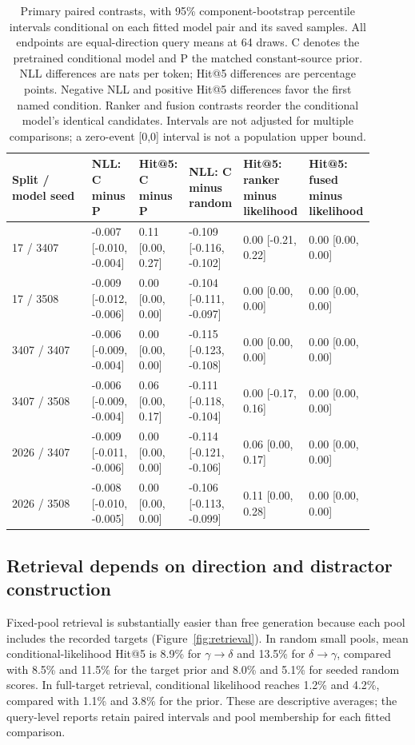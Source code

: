 \documentclass[10pt]{article}
\newcommand{\gtd}{\ensuremath{\gamma\!\rightarrow\!\delta}}
\newcommand{\dtg}{\ensuremath{\delta\!\rightarrow\!\gamma}}
\begin{document}
\begin{table}[ht]
\centering
\caption{Primary paired contrasts, with 95\% component-bootstrap percentile intervals conditional on each fitted model pair and its saved samples. All endpoints are equal-direction query means at 64 draws. C denotes the pretrained conditional model and P the matched constant-source prior. NLL differences are nats per token; Hit@5 differences are percentage points. Negative NLL and positive Hit@5 differences favor the first named condition. Ranker and fusion contrasts reorder the conditional model's identical candidates. Intervals are not adjusted for multiple comparisons; a zero-event [0,0] interval is not a population upper bound.}
\label{tab:paired}
\small
\setlength{\tabcolsep}{3pt}
\begin{tabular}{p{0.2200\linewidth}p{0.1360\linewidth}p{0.1360\linewidth}p{0.1360\linewidth}p{0.1360\linewidth}p{0.1360\linewidth}}
\toprule
Split / model seed & NLL: C minus P & Hit@5: C minus P & NLL: C minus random & Hit@5: ranker minus likelihood & Hit@5: fused minus likelihood\\
\midrule
17 / 3407 & -0.007 [-0.010, -0.004] & 0.11 [0.00, 0.27] & -0.109 [-0.116, -0.102] & 0.00 [-0.21, 0.22] & 0.00 [0.00, 0.00]\\
17 / 3508 & -0.009 [-0.012, -0.006] & 0.00 [0.00, 0.00] & -0.104 [-0.111, -0.097] & 0.00 [0.00, 0.00] & 0.00 [0.00, 0.00]\\
3407 / 3407 & -0.006 [-0.009, -0.004] & 0.00 [0.00, 0.00] & -0.115 [-0.123, -0.108] & 0.00 [0.00, 0.00] & 0.00 [0.00, 0.00]\\
3407 / 3508 & -0.006 [-0.009, -0.004] & 0.06 [0.00, 0.17] & -0.111 [-0.118, -0.104] & 0.00 [-0.17, 0.16] & 0.00 [0.00, 0.00]\\
2026 / 3407 & -0.009 [-0.011, -0.006] & 0.00 [0.00, 0.00] & -0.114 [-0.121, -0.106] & 0.06 [0.00, 0.17] & 0.00 [0.00, 0.00]\\
2026 / 3508 & -0.008 [-0.010, -0.005] & 0.00 [0.00, 0.00] & -0.106 [-0.113, -0.099] & 0.11 [0.00, 0.28] & 0.00 [0.00, 0.00]\\
\bottomrule
\end{tabular}
\end{table}

\subsection{Retrieval depends on direction and distractor construction}
Fixed-pool retrieval is substantially easier than free generation because each
pool includes the recorded targets (Figure~\ref{fig:retrieval}). In random
small pools, mean conditional-likelihood Hit@5 is 8.9\% for \gtd{} and
13.5\% for \dtg{}, compared with 8.5\% and 11.5\% for the target prior and
8.0\% and 5.1\% for seeded random scores. In full-target retrieval,
conditional likelihood reaches 1.2\% and 4.2\%, compared with 1.1\% and
3.8\% for the prior. These are descriptive averages; the query-level reports
retain paired intervals and pool membership for each fitted comparison.
\end{document}
